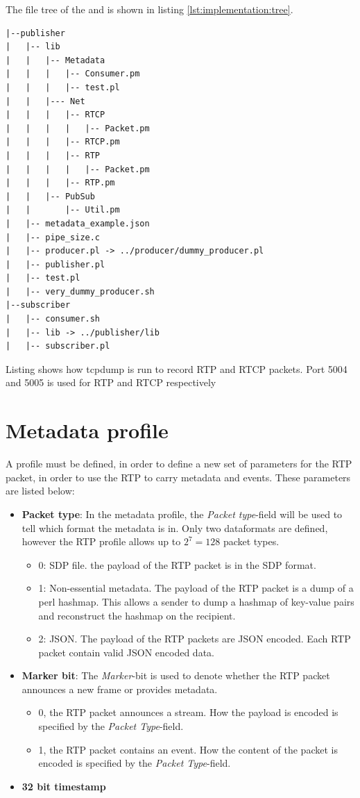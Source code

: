 The file tree of the \pub{} and \sub{} is shown in listing \ref{lst:implementation:tree}.
\begin{listing}[h] 
	\begin{verbatim}
|--publisher
|   |-- lib
|   |   |-- Metadata
|   |   |   |-- Consumer.pm
|   |   |   |-- test.pl
|   |   |--- Net
|   |   |   |-- RTCP
|   |   |   |   |-- Packet.pm
|   |   |   |-- RTCP.pm
|   |   |   |-- RTP
|   |   |   |   |-- Packet.pm
|   |   |   |-- RTP.pm
|   |   |-- PubSub
|   |       |-- Util.pm
|   |-- metadata_example.json
|   |-- pipe_size.c
|   |-- producer.pl -> ../producer/dummy_producer.pl
|   |-- publisher.pl
|   |-- test.pl
|   |-- very_dummy_producer.sh
|--subscriber
|   |-- consumer.sh
|   |-- lib -> ../publisher/lib
|   |-- subscriber.pl

	\end{verbatim}
\caption{Listing shows how tcpdump is run to record RTP and RTCP packets. Port 5004 and 5005 is used for RTP and RTCP respectively}
\label{cmd:implementation:tcpreplay}
\end{listing}

\section{Metadata profile} \label{sec:implemented:metadataprofile} 
A profile must be defined, in order to define a new set of parameters for the RTP packet, in order to use the RTP to carry metadata and events. These parameters are listed below:

\begin{itemize}
	\item \textbf{Packet type}: In the metadata profile, the \textit{Packet type}-field will be used to tell which format the metadata is in. Only two  dataformats are defined, however the RTP profile allows up to $2^7=128$  packet types.
		\begin{itemize}
			\item 0: SDP file. the payload of the RTP packet is in the SDP format.
			\item 1: Non-essential metadata. The payload of the RTP packet is a dump of a perl hashmap. This allows a sender to dump a hashmap of key-value pairs and reconstruct the hashmap on the recipient.
			\item 2: JSON. The payload of the RTP packets are JSON encoded. Each RTP packet contain valid JSON encoded data.
		\end{itemize}
	\item \textbf{Marker bit}: The \textit{Marker}-bit is used to denote whether the RTP packet announces a new frame or provides metadata.
		\begin{itemize}
			\item 0, the RTP packet announces a stream. How the payload is encoded is specified by the \textit{Packet Type}-field.
			\item 1, the RTP packet contains an event. How the content of the packet is encoded is specified by the \textit{Packet Type}-field.
		\end{itemize}
	\item \textbf{32 bit timestamp}
\end{itemize}




